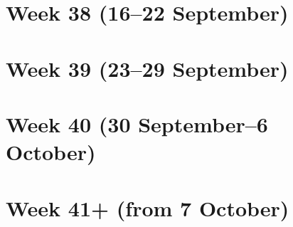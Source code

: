 \documentclass{article}
\begin{document}
\section{Week 38 (16--22 September)}

\section{Week 39 (23--29 September)}

\section{Week 40 (30 September--6 October)}

\section{Week 41+ (from 7 October)}
\end{document}
